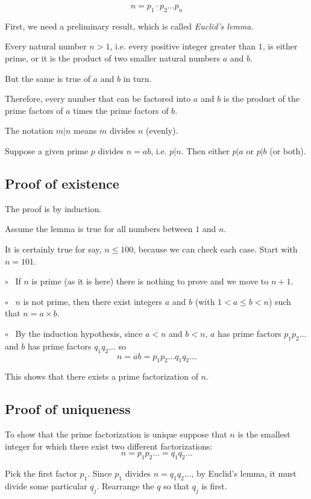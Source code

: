 \documentclass[11pt, oneside]{article}
\begin{document}
\[ n = p_1 \cdot p_2 \dots p_n \]

First, we need a preliminary result, which is called \emph{Euclid's lemma}.

Every natural number $n > 1$, i.e. every positive integer greater than $1$, is either prime, or it is the product of two smaller natural numbers $a$ and $b$.

But the same is true of $a$ and $b$ in turn.

Therefore, every number that can be factored into $a$ and $b$ is the product of the prime factors of $a$ times the prime factors of $b$.  

The notation $m|n$ means $m$ divides $n$ (evenly).

Suppose a given prime $p$ divides $n = ab$, i.e. $p|n$.  Then either $p|a$ or  $p|b$ (or both).

\subsection*{Proof of existence}

The proof is by induction.

Assume the lemma is true for all numbers between $1$ and $n$.  

It is certainly true for say, $n \le 100$, because we can check each case.  Start with $n = 101$.

$\circ$ \ If $n$ is prime (as it is here) there is nothing to prove and we move to $n + 1$.  

$\circ$ \  $n$ is not prime, then there exist integers $a$ and $b$ (with $1 < a \le b < n$) such that $n = a \times b$.

$\circ$ \ By the induction hypothesis, since $a < n$ and $b < n$, $a$ has prime factors $p_1 p_2 \dots$ and $b$ has prime factors $q_1 q_2 \dots$ so
\[ n = ab = p_1 p_2 \dots q_1 q_2 \dots \]

This shows that there exists a prime factorization of $n$.

\subsection*{Proof of uniqueness}

To show that the prime factorization is unique suppose that $n$ is the smallest integer for which there exist two different factorizations:
\[ n = p_1 p_2 \dots = q_1 q_2 \dots \]
    
Pick the first factor $p_1$.  Since $p_1$ divides $n = q_1 q_2 \dots$, by Euclid's lemma, it must divide some particular $q_j$.  Rearrange the $q$ so that $q_j$ is first.
\end{document}
